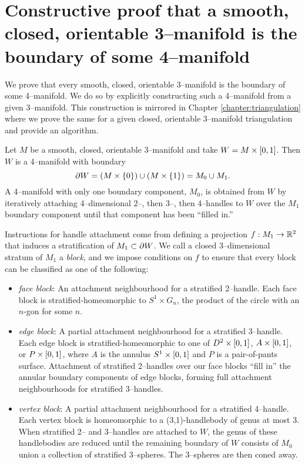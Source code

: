 \chapter[Smooth]{Constructive proof that a smooth, closed, orientable 3--manifold is the boundary of some 4--manifold}
\label{chapter:smooth}

We prove that every smooth, closed, orientable 3--manifold is the boundary of some 4--manifold.
We do so by explicitly constructing such a 4--manifold from a given 3--manifold.
This construction is mirrored in Chapter \ref{chapter:triangulation} where we prove the same for a given closed, orientable 3--manifold triangulation and provide an algorithm.

Let $M$ be a smooth, closed, orientable 3--manifold and take $W=M\times [0,1]$.
Then $W$ is a 4--manifold with boundary
\[
	\partial W = (M\times\{0\}) \cup (M\times\{1\}) = M_0 \cup M_1.
\]
A 4--manifold with only one boundary component, $M_0$, is obtained from $W$ by iteratively attaching 4--dimensional 2--, then 3--, then 4--handles to $W$ over the $M_1$ boundary component until that component has been ``filled in.''

Instructions for handle attachment come from defining a projection $f:M_1\to \mathbb{R}^2$ that induces a stratification of $M_1\subset\partial W$.
%
%
We call a closed 3--dimensional stratum of $M_1$ a \emph{block}, and we impose conditions on $f$ to ensure that every block can be classified as one of the following:
\begin{itemize}
	\item \emph{face block}:
		An attachment neighbourhood for a stratified 2--handle.
		Each face block is stratified-homeomorphic to $S^1\times G_n$, the product of the circle with an $n$-gon for some $n$.
	
	\item \emph{edge block}:
		A partial attachment neighbourhood for a stratified 3--handle.
		Each edge block is stratified-homeomorphic to one of $D^2\times[0,1]$, $A\times[0,1]$, or $P\times[0,1]$, where $A$ is the annulus $S^1\times[0,1]$ and $P$ is a pair-of-pants surface.
		Attachment of stratified 2--handles over our face blocks ``fill in'' the annular boundary components of edge blocks, forming full attachment neighbourhoods for stratified 3--handles.
		
	\item \emph{vertex block}:
		A partial attachment neighbourhood for a stratified 4--handle.
		Each vertex block is homeomorphic to a (3,1)-handlebody of genus at most 3.
		When stratified 2-- and 3--handles are attached to $W$, the genus of these handlebodies are reduced until the remaining boundary of $W$ consists of $M_0$ union a collection of stratified 3--spheres.  The 3--spheres are then coned away.
\end{itemize}
 
